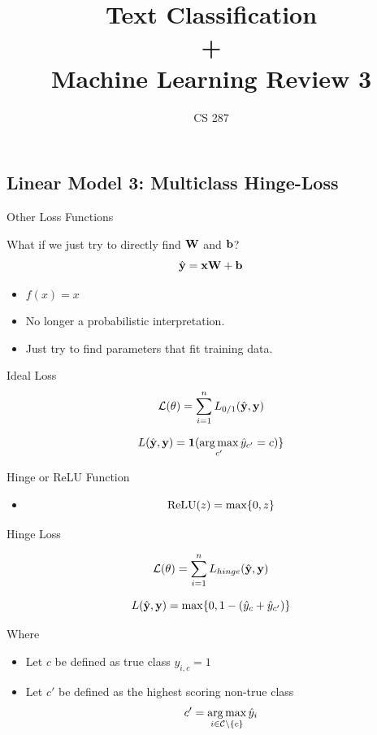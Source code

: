 \documentclass{beamer}
\title{Text Classification\\ + \\ Machine Learning Review 3 }
\date{}
\author{CS 287}
\begin{document}
\begin{frame}
  \titlepage
\end{frame}

\subsection{Linear Model 3: Multiclass Hinge-Loss}


\begin{frame}{Other Loss Functions}
  
  What if we just try to directly find $\mathbf{W}$ and $\mathbf{b}$? 
     \[\hat{\mathbf{y}} = \mathbf{x} \mathbf{W} + \mathbf{b}\]   
     
     \begin{itemize}
     \item $f(x) = x$ 
     \item No longer a probabilistic interpretation.
     \item Just try to find parameters that fit training data.
     \end{itemize}

\end{frame}

\begin{frame}{Ideal Loss}
  \[{\mathcal{L}(\theta)} = \sum_{i=1}^n L_{0/1}(\hat{\mathbf{y}}, \mathbf{y}) \] 

  \[ L(\hat{\boldy}, \boldy) =  \indicator(\argmax_{c'} \hat{y}_{c'} = c) \}  \]
\end{frame}


\begin{frame}{Hinge or ReLU Function}
  \begin{itemize}
  \item \[\relu(z) = \max\{0, z\}  \]
  \end{itemize}

\end{frame}

\begin{frame}{Hinge Loss}

  \[{\mathcal{L}(\theta)} = \sum_{i=1}^n L_{hinge}(\hat{\mathbf{y}}, \mathbf{y}) \] 


  \[ L(\hat{\mathbf{y}}, \mathbf{y}) =  \max\{0, 1 - (\hat{y}_{c} + \hat{y}_{c'}) \}  \]

  Where 
  \begin{itemize}
  \item   Let $c$ be defined as true class $y_{i, c} = 1$  
  \item   Let $c'$ be defined as the highest scoring non-true class 
    \[c' = \argmax_{i \in \mcC \setminus\{c\}} \hat{y}_i \] 
  \end{itemize}
\end{frame}
\end{document}
